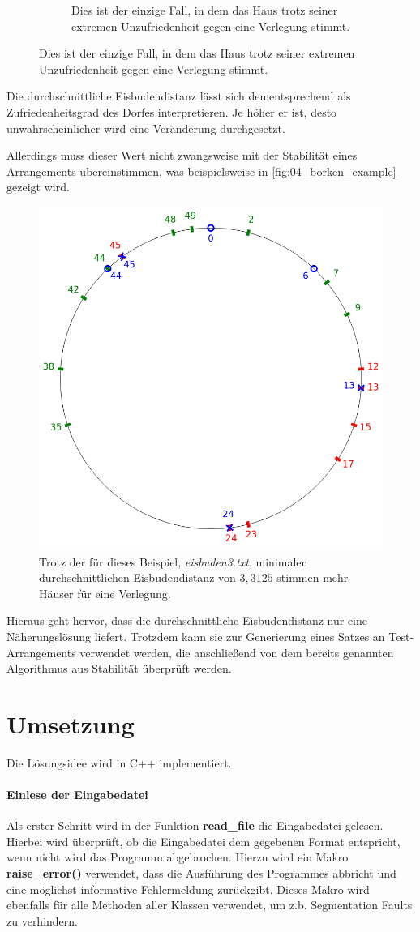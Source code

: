 \documentclass[a4paper,10pt,ngerman]{scrartcl}
\begin{document}
\begin{figure}[ht]
\begin{subfigure}[t]{0.4\linewidth}
        \caption{Dies ist der einzige Fall, in dem das Haus trotz seiner extremen Unzufriedenheit gegen eine Verlegung stimmt.}
        \label{fig:03_slightly_happy_house}
    \end{subfigure}
\end{figure}
Die durchschnittliche Eisbudendistanz lässt sich dementsprechend als \glqq Zufriedenheitsgrad\grqq{} des Dorfes interpretieren.
Je höher er ist, desto unwahrscheinlicher wird eine Veränderung durchgesetzt.

Allerdings muss dieser Wert nicht zwangsweise mit der Stabilität eines Arrangements übereinstimmen, was beispielsweise in \autoref{fig:04_borken_example} gezeigt wird.
\begin{figure}[ht]
    \centering
    \includegraphics[width=0.4\linewidth]{04_broken_example.png}
    \caption{Trotz der für dieses Beispiel, \textit{eisbuden3.txt}, minimalen durchschnittlichen Eisbudendistanz von $3,3125$ stimmen mehr Häuser für eine Verlegung.}
    \label{fig:04_borken_example}
\end{figure}
Hieraus geht hervor, dass die durchschnittliche Eisbudendistanz nur eine Näherungslösung liefert.
Trotzdem kann sie zur Generierung eines Satzes an Test-Arrangements verwendet werden, die anschließend von dem bereits genannten Algorithmus aus Stabilität überprüft werden.

\section{Umsetzung}
Die Lösungsidee wird in C++ implementiert.

\paragraph{Einlese der Eingabedatei}
Als erster Schritt wird in der Funktion \textbf{read\_file} die Eingabedatei gelesen.
Hierbei wird überprüft, ob die Eingabedatei dem gegebenen Format entspricht, wenn nicht wird das Programm abgebrochen.
Hierzu wird ein Makro \textbf{raise\_error()} verwendet, dass die Ausführung des Programmes abbricht und eine möglichst informative Fehlermeldung zurückgibt.
Dieses Makro wird ebenfalls für alle Methoden aller Klassen verwendet, um z.b. Segmentation Faults zu verhindern.
\end{document}
